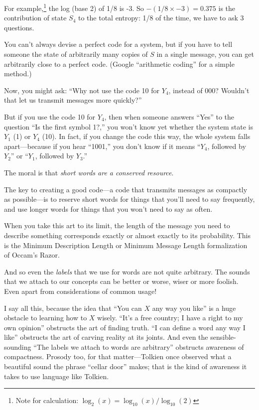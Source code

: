 { For example,\footnote{Note for calculation: $\log_2(x) = \log_{10}(x)/\log_{10}(2)$} the log (base 2) of 1/8 is -3. So $-(1/8
\times -3) = 0.375$ is the contribution of state
$S_{4}$ to the total entropy: 1/8 of the time, we have to
ask 3 questions.


 You can't always devise a perfect code for a
system, but if you have to tell someone the state of arbitrarily many
copies of $S$ in a single message, you can get arbitrarily close to a
perfect code. (Google ``arithmetic
coding'' for a simple method.)


 Now, you might ask: ``Why not use the code 10 for
$Y_{4}$, instead of 000? Wouldn't that let
us transmit messages more quickly?''


 But if you use the code 10 for $Y_{4}$, then when
someone answers ``Yes'' to the
question ``Is the first symbol 1?,''
you won't know yet whether the system state is
$Y_{1}$ (1) or $Y_{4}$ (10). In fact, if you
change the code this way, the whole system falls apart---because if you
hear ``1001,'' you
don't know if it means
``$Y_{4}$, followed by
$Y_{2}$'' or
``$Y_{1}$, followed by
$Y_{3}$.''


 The moral is that \textit{short words are a conserved resource}.


 The key to creating a good code---a code that transmits messages
as compactly as possible---is to reserve short words for things that
you'll need to say frequently, and use longer words for
things that you won't need to say as often.


 When you take this art to its limit, the length of the message you
need to describe something corresponds exactly or almost exactly to its
probability. This is the Minimum Description Length or Minimum Message
Length formalization of Occam's Razor.


 And so even the \textit{labels} that we use for words are not
quite arbitrary. The sounds that we attach to our concepts can be
better or worse, wiser or more foolish. Even apart from considerations
of common usage!


 I say all this, because the idea that ``You can $X$
any way you like'' is a huge obstacle to learning how
to $X$ wisely. ``It's a free country; I
have a right to my own opinion'' obstructs the art of
finding truth. ``I can define a word any way I
like'' obstructs the art of carving reality at its
joints. And even the sensible-sounding ``The labels we
attach to words are arbitrary'' obstructs awareness
of compactness. Prosody too, for that matter---Tolkien once observed
what a beautiful sound the phrase ``cellar
door'' makes; that is the kind of awareness it takes
to use language like Tolkien.


}
